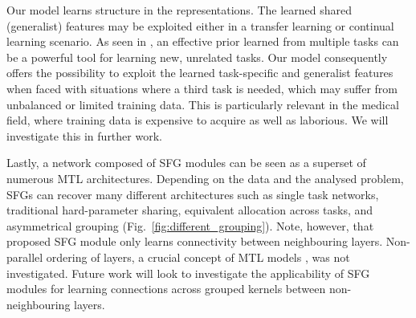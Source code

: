 Our model learns structure in the representations. The learned shared (generalist) features may be exploited either in a transfer learning or continual learning scenario. As seen in \cite{lacost2018}, an effective prior learned from multiple tasks can be a powerful tool for learning new, unrelated tasks. Our model consequently offers the possibility to exploit the learned task-specific and generalist features when faced with situations where a third task is needed, which may suffer from unbalanced or limited training data. This is particularly relevant in the medical field, where training data is expensive to acquire as well as laborious. We will investigate this in further work.

Lastly, a network composed of SFG modules can be seen as a superset of numerous MTL architectures. Depending on the data and the analysed problem, SFGs can recover many different architectures such as single task networks, traditional hard-parameter sharing, equivalent allocation across tasks, and asymmetrical grouping (Fig.~\ref{fig:different_grouping}). Note, however, that proposed SFG module only learns connectivity between neighbouring layers. Non-parallel ordering of layers, a crucial concept of MTL models \cite{meyerson2018beyond, Ruder2019SluiceNL}, was not investigated. Future work will look to investigate the applicability of SFG modules for learning connections across grouped kernels between non-neighbouring layers.







